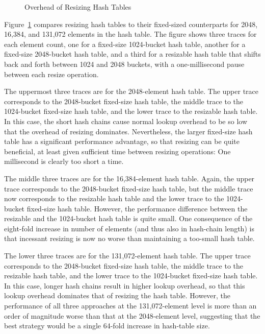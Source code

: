 \begin{figure}[tb]
\centering
{}
\caption{Overhead of Resizing Hash Tables}
\label{fig:datastruct:Overhead of Resizing Hash Tables}
\end{figure}

Figure~\ref{fig:datastruct:Overhead of Resizing Hash Tables}
compares resizing hash tables to their fixed-sized counterparts
for 2048, 16,384, and 131,072 elements in the hash table.
The figure shows three traces for each element count, one
for a fixed-size 1024-bucket hash table, another for a
fixed-size 2048-bucket hash table, and a third for a resizable
hash table that shifts back and forth between 1024 and 2048
buckets, with a one-millisecond pause between each resize operation.

The uppermost three traces are for the 2048-element hash table.
The upper trace corresponds to the 2048-bucket fixed-size hash
table, the middle trace to the 1024-bucket fixed-size hash table,
and the lower trace to the resizable hash table.
In this case, the short hash chains cause normal lookup overhead
to be so low that the overhead of resizing dominates.
Nevertheless, the larger fixed-size hash table has a significant
performance advantage, so that resizing can be quite beneficial,
at least given sufficient time between resizing operations: One
millisecond is clearly too short a time.

The middle three traces are for the 16,384-element hash table.
Again, the upper trace corresponds to the 2048-bucket fixed-size hash
table, but the middle trace now corresponds to the resizable hash
table and the lower trace to the 1024-bucket fixed-size hash table.
However, the performance difference between the resizable and the
1024-bucket hash table is quite small.
One consequence of the eight-fold increase in number of elements
(and thus also in hash-chain length) is that incessant resizing
is now no worse than maintaining a too-small hash table.

The lower three traces are for the 131,072-element hash table.
The upper trace corresponds to the 2048-bucket fixed-size hash table,
the middle trace to the resizable hash table, and the lower trace
to the 1024-bucket fixed-size hash table.
In this case, longer hash chains result in higher lookup overhead,
so that this lookup overhead dominates that of resizing the hash
table.
However, the performance of all three approaches at the 131,072-element
level is more than an order of magnitude worse than that at the
2048-element level, suggesting that the best strategy would be
a single 64-fold increase in hash-table size.


